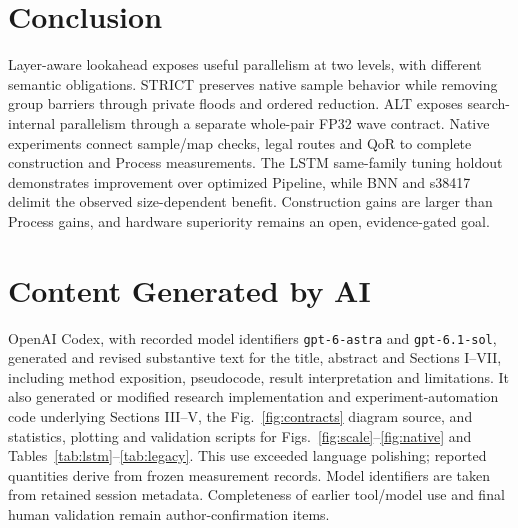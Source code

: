 \documentclass[conference,10pt,letterpaper]{IEEEtran}
\begin{document}
\section{Conclusion}
Layer-aware lookahead exposes useful parallelism at two levels, with different semantic obligations. STRICT preserves native sample behavior while removing group barriers through private floods and ordered reduction. ALT exposes search-internal parallelism through a separate whole-pair FP32 wave contract. Native experiments connect sample/map checks, legal routes and QoR to complete construction and Process measurements. The LSTM same-family tuning holdout demonstrates improvement over optimized Pipeline, while BNN and s38417 delimit the observed size-dependent benefit. Construction gains are larger than Process gains, and hardware superiority remains an open, evidence-gated goal.
\section*{Content Generated by AI}
OpenAI Codex, with recorded model identifiers \texttt{gpt-6-astra} and \texttt{gpt-6.1-sol}, generated and revised substantive text for the title, abstract and Sections I--VII, including method exposition, pseudocode, result interpretation and limitations. It also generated or modified research implementation and experiment-automation code underlying Sections III--V, the Fig.~\ref{fig:contracts} diagram source, and statistics, plotting and validation scripts for Figs.~\ref{fig:scale}--\ref{fig:native} and Tables~\ref{tab:lstm}--\ref{tab:legacy}. This use exceeded language polishing; reported quantities derive from frozen measurement records. Model identifiers are taken from retained session metadata. Completeness of earlier tool/model use and final human validation remain author-confirmation items.
\clearpage


\end{document}
